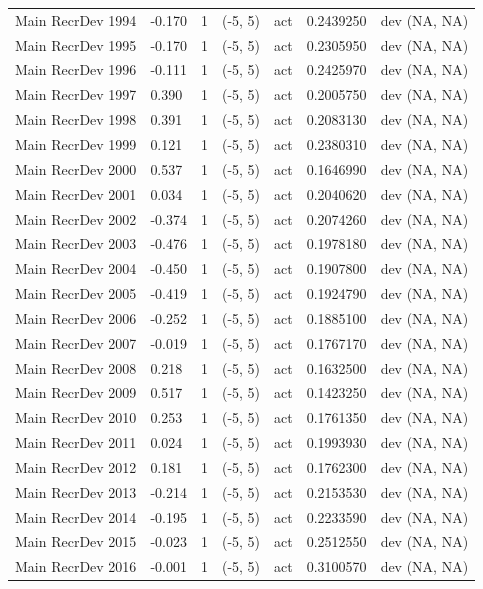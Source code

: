 \documentclass[11pt,
  english,
  a4paper,
]{article}
\begin{document}
\begin{landscape}
\begin{longtable}[t]{>{\raggedright\arraybackslash}p{7cm}lllll>{\raggedright\arraybackslash}p{4cm}}
Main RecrDev 1994 & -0.170 & 1 & (-5, 5) & act & 0.2439250 & dev (NA, NA)\\
Main RecrDev 1995 & -0.170 & 1 & (-5, 5) & act & 0.2305950 & dev (NA, NA)\\
Main RecrDev 1996 & -0.111 & 1 & (-5, 5) & act & 0.2425970 & dev (NA, NA)\\
Main RecrDev 1997 & 0.390 & 1 & (-5, 5) & act & 0.2005750 & dev (NA, NA)\\
Main RecrDev 1998 & 0.391 & 1 & (-5, 5) & act & 0.2083130 & dev (NA, NA)\\
Main RecrDev 1999 & 0.121 & 1 & (-5, 5) & act & 0.2380310 & dev (NA, NA)\\
Main RecrDev 2000 & 0.537 & 1 & (-5, 5) & act & 0.1646990 & dev (NA, NA)\\
Main RecrDev 2001 & 0.034 & 1 & (-5, 5) & act & 0.2040620 & dev (NA, NA)\\
Main RecrDev 2002 & -0.374 & 1 & (-5, 5) & act & 0.2074260 & dev (NA, NA)\\
Main RecrDev 2003 & -0.476 & 1 & (-5, 5) & act & 0.1978180 & dev (NA, NA)\\
Main RecrDev 2004 & -0.450 & 1 & (-5, 5) & act & 0.1907800 & dev (NA, NA)\\
Main RecrDev 2005 & -0.419 & 1 & (-5, 5) & act & 0.1924790 & dev (NA, NA)\\
Main RecrDev 2006 & -0.252 & 1 & (-5, 5) & act & 0.1885100 & dev (NA, NA)\\
Main RecrDev 2007 & -0.019 & 1 & (-5, 5) & act & 0.1767170 & dev (NA, NA)\\
Main RecrDev 2008 & 0.218 & 1 & (-5, 5) & act & 0.1632500 & dev (NA, NA)\\
Main RecrDev 2009 & 0.517 & 1 & (-5, 5) & act & 0.1423250 & dev (NA, NA)\\
Main RecrDev 2010 & 0.253 & 1 & (-5, 5) & act & 0.1761350 & dev (NA, NA)\\
Main RecrDev 2011 & 0.024 & 1 & (-5, 5) & act & 0.1993930 & dev (NA, NA)\\
Main RecrDev 2012 & 0.181 & 1 & (-5, 5) & act & 0.1762300 & dev (NA, NA)\\
Main RecrDev 2013 & -0.214 & 1 & (-5, 5) & act & 0.2153530 & dev (NA, NA)\\
Main RecrDev 2014 & -0.195 & 1 & (-5, 5) & act & 0.2233590 & dev (NA, NA)\\
Main RecrDev 2015 & -0.023 & 1 & (-5, 5) & act & 0.2512550 & dev (NA, NA)\\
Main RecrDev 2016 & -0.001 & 1 & (-5, 5) & act & 0.3100570 & dev (NA, NA)\\

\end{longtable}
\end{landscape}
\end{document}
